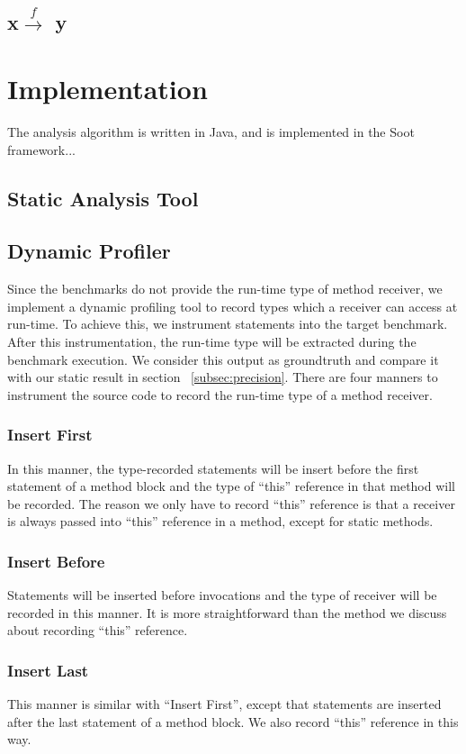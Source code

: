 \documentclass{fac}
\newcommand{\hflow}{\longrightarrow}
\newcommand{\lhflow}[1]{\stackrel{#1}{\hflow}}
\begin{document}
\subsection{x$\lhflow{f}$ y}

\section{Implementation}\label{sec:implementation}
The analysis algorithm is written in Java, and is implemented in the Soot framework...

\subsection{Static Analysis Tool}\label{subsec:static-analysis-tool}

\subsection{Dynamic Profiler}\label{subsec:dynamic-profiler}
Since the benchmarks do not provide the run-time type of method receiver, we implement a dynamic profiling tool to record  types which a receiver can access at run-time. To achieve this, we instrument statements into the target benchmark. After this instrumentation, the run-time type will be extracted during the benchmark execution. We consider this output as groundtruth and compare it with our static result in section ~\ref{subsec:precision}. There are four manners to instrument the source code to record the run-time type of a method receiver.
\subsubsection{Insert First}\label{subsubsec:insert-first}
In this manner, the type-recorded statements will be insert before the first statement of a method block and the type of ``this'' reference in that method will be recorded. The reason we only have to record ``this'' reference is that a receiver is always passed into ``this'' reference in a method, except for static methods. 
\subsubsection{Insert Before}\label{subsubsec:insert-before}
Statements will be inserted before invocations and the type of receiver will be recorded in this manner. It is more straightforward than the method we discuss about recording ``this'' reference.
\subsubsection{Insert Last}\label{subsubsec:insert-last}
This manner is similar with ``Insert First'', except that statements are inserted after the last statement of a method block. We also record ``this'' reference in this way.
\end{document}
